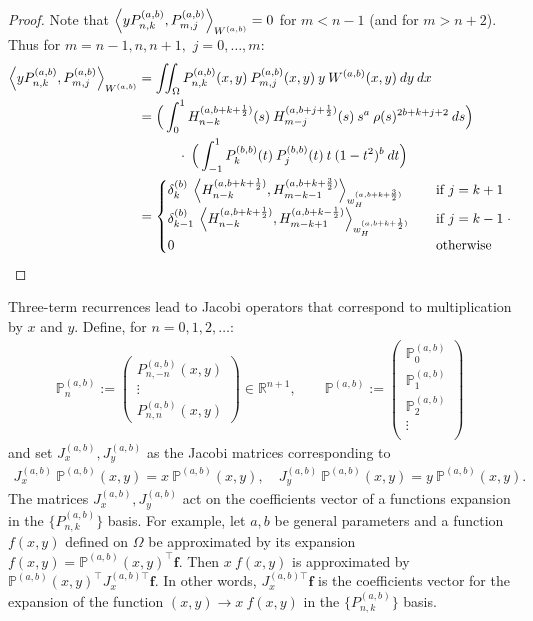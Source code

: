 \documentclass[11pt, oneside]{article}   	%
\newcommand{\half}{\frac{1}{2}}
\newcommand{\R}{\mathbb{R}}
\newcommand{\bigP}{\mathbb{P}}
\newcommand{\Pnkab}{P_{n,k}^{(a,b)}}
\newcommand{\Wab}{{W^{(a,b)}}}
\newcommand{\Pmjab}{P_{m,j}^{(a,b)}}
\newcommand{\bigPab}{\bigP^{(a,b)}}
\begin{document}
\begin{proof}
Note that \(\ip<y \Pnkab, P_{m,j}^{(a,b)}>_\Wab = 0\) for \(m < n-1\) (and for \(m > n+2\)). Thus for \(m = n-1, n, n+1,\) \(j = 0,\dots,m:\)
\begin{align}
\ip<y \Pnkab, P_{m,j}^{(a,b)}>_\Wab &=  \iint_\Omega \Pnkab(x,y) \: \Pmjab(x,y) \: y \: \Wab(x,y) \: dy \: dx \\
&= \Big( \int^1_0 H_{n-k}^{(a, b+k+\half)}(s) \: H_{m-j}^{(a, b+j+\half)}(s) \: s^a \: \rho(s)^{2b+k+j+2} \: ds \Big) \nonumber \\
& \quad \quad \quad\cdot \: \Big( \int^1_{-1} P_k^{(b,b)}(t) \: P_j^{(b,b)}(t) \: t \: (1-t^2)^b \: dt \Big) \\
&= \begin{cases}
    	\delta_k^{(b)} \: \ip<H_{n-k}^{(a, b+k+\half)}, H_{m-k-1}^{(a, b+k+\frac{3}{2})}>_{w_H^{(a, b+k+\frac{3}{2})}} \quad& \text{if } j = k+1 \\
	\delta_{k-1}^{(b)} \: \ip<H_{n-k}^{(a, b+k+\half)}, H_{m-k+1}^{(a, b+k-\half)}>_{w_H^{(a, b+k+\half)}} \quad& \text{if } j = k-1 \\
	0 & \text{otherwise}
      \end{cases}.
\end{align}

\end{proof}


Three-term recurrences lead to Jacobi operators that correspond to multiplication by $x$ and $y$. Define, for $n=0,1,2,\dots$: 
\begin{align}
\bigPab_n := \begin{pmatrix}
		P^{(a,b)}_{n,-n}(x,y) \\
		\vdots \\
		P^{(a,b)}_{n,n}(x,y)
	\end{pmatrix} \in \R^{n+1}, 
\quad \quad 
\bigPab := \begin{pmatrix}
		\bigPab_0 \\
		\bigPab_1 \\
		\bigPab_2 \\
		\vdots \\
	\end{pmatrix}
\end{align}
and set $J_x^{(a,b)}, J_y^{(a,b)}$ as the Jacobi matrices corresponding to
\begin{align}
J_x^{(a,b)} \: \bigPab(x,y) = x \: \bigPab(x,y), \quad J_y^{(a,b)} \: \bigPab(x,y) = y \: \bigPab(x,y).
\label{eqn:jacobimatricesdefinition}
\end{align}
The matrices $J_x^{(a,b)}, J_y^{(a,b)}$ act on the coefficients vector of a functions expansion in the $\{\Pnkab\}$ basis. For example, let $a, b$ be general parameters and a function $f(x,y)$ defined on $\Omega$ be approximated by its expansion $f(x,y) = \bigPab(x,y)^\top \mathbf{f}$. Then $x \: f(x,y)$ is approximated by $\bigPab(x,y)^\top {J_x^{(a,b)\top}} \mathbf{f}$. In other words, ${J_x^{(a,b)\top}} \mathbf{f}$ is the coefficients vector for the expansion of the function $(x,y) \to x \: f(x,y)$ in the  $\{\Pnkab\}$ basis.
\end{document}
